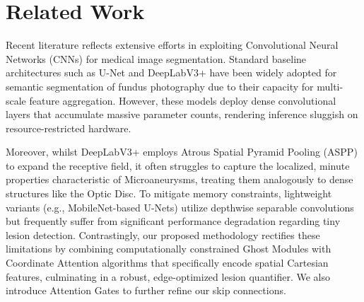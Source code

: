 \section{Related Work}
Recent literature reflects extensive efforts in exploiting Convolutional Neural Networks (CNNs) for medical image segmentation. Standard baseline architectures such as U-Net \cite{unet_2015} and DeepLabV3+ \cite{deeplabv3_2018} have been widely adopted for semantic segmentation of fundus photography due to their capacity for multi-scale feature aggregation. However, these models deploy dense convolutional layers that accumulate massive parameter counts, rendering inference sluggish on resource-restricted hardware.

Moreover, whilst DeepLabV3+ employs Atrous Spatial Pyramid Pooling (ASPP) to expand the receptive field, it often struggles to capture the localized, minute properties characteristic of Microaneurysms, treating them analogously to dense structures like the Optic Disc. To mitigate memory constraints, lightweight variants (e.g., MobileNet-based U-Nets) utilize depthwise separable convolutions but frequently suffer from significant performance degradation regarding tiny lesion detection. Contrastingly, our proposed methodology rectifies these limitations by combining computationally constrained Ghost Modules \cite{ghostnet_2020} with Coordinate Attention algorithms \cite{coord_attn_2021} that specifically encode spatial Cartesian features, culminating in a robust, edge-optimized lesion quantifier. We also introduce Attention Gates \cite{attention_unet_2018} to further refine our skip connections.
